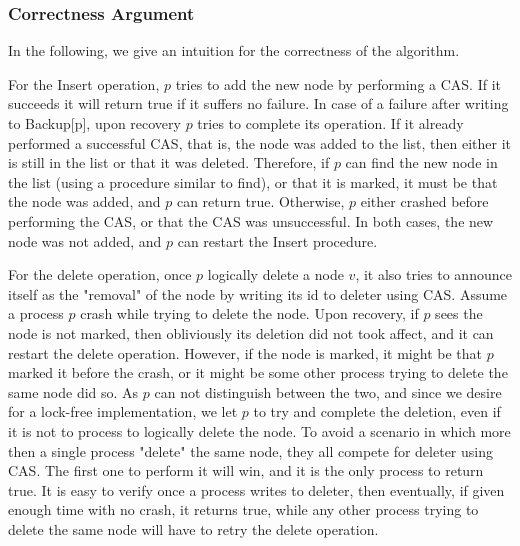 \subsubsection*{Correctness Argument}
In the following, we give an intuition for the correctness of the algorithm.

For the Insert operation, $p$ tries to add the new node by performing a CAS. If it succeeds it will return true if it suffers no failure. In case of a failure after writing to Backup[p], upon recovery $p$ tries to complete its operation. If it already performed a successful CAS, that is, the node was added to the list, then either it is still in the list or that it was deleted. Therefore, if $p$ can find the new node in the list (using a procedure similar to find), or that it is marked, it must be that the node was added, and $p$ can return true. Otherwise, $p$ either crashed before performing the CAS, or that the CAS was unsuccessful. In both cases, the new node was not added, and $p$ can restart the Insert procedure.

For the delete operation, once $p$ logically delete a node $v$, it also tries to announce itself as the "removal" of the node by writing its id to deleter using CAS. Assume a process $p$ crash while trying to delete the node. Upon recovery, if $p$ sees the node is not marked, then obliviously its deletion did not took affect, and it can restart the delete operation. However, if the node is marked, it might be that $p$ marked it before the crash, or it might be some other process trying to delete the same node did so. As $p$ can not distinguish between the two, and since we desire for a lock-free implementation, we let $p$ to try and complete the deletion, even if it is not to process to logically delete the node. To avoid a scenario in which more then a single process "delete" the same node, they all compete for deleter using CAS. The first one to perform it will win, and it is the only process to return true. It is easy to verify once a process writes to deleter, then eventually, if given enough time with no crash, it returns true, while any other process trying to delete the same node will have to retry the delete operation.








 